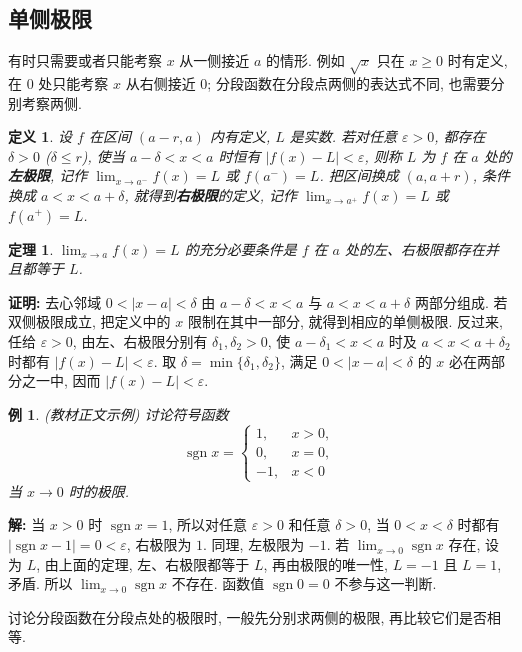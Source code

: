 \documentclass[UTF8,openany]{ctexbook}
\theoremstyle{chinesetextbook}
\newtheorem{definition}{定义}[section]
\newtheorem{example}{例}[section]
\newtheorem{theorem}{定理}[section]
\newenvironment{cnproof}{\par\indent\textbf{证明:} \ignorespaces}{\par}
\newenvironment{cnsolution}{\par\indent\textbf{解:} \ignorespaces}{\par}
\begin{document}
\subsection{单侧极限}
有时只需要或者只能考察 $x$ 从一侧接近 $a$ 的情形. 例如 $\sqrt x$ 只在 $x\ge0$ 时有定义, 在 $0$ 处只能考察 $x$ 从右侧接近 $0$; 分段函数在分段点两侧的表达式不同, 也需要分别考察两侧.
\begin{definition}
设 $f$ 在区间 $(a-r,a)$ 内有定义, $L$ 是实数. 若对任意 $\varepsilon>0$, 都存在 $\delta>0$ ($\delta\le r$), 使当 $a-\delta<x<a$ 时恒有 $|f(x)-L|<\varepsilon$, 则称 $L$ 为 $f$ 在 $a$ 处的\textbf{左极限}, 记作 $\displaystyle\lim_{x\to a^-}f(x)=L$ 或 $f(a^-)=L$. 把区间换成 $(a,a+r)$, 条件换成 $a<x<a+\delta$, 就得到\textbf{右极限}的定义, 记作 $\displaystyle\lim_{x\to a^+}f(x)=L$ 或 $f(a^+)=L$.
\end{definition}
\begin{theorem}
$\displaystyle\lim_{x\to a}f(x)=L$ 的充分必要条件是 $f$ 在 $a$ 处的左、右极限都存在并且都等于 $L$.
\end{theorem}
\begin{cnproof}
去心邻域 $0<|x-a|<\delta$ 由 $a-\delta<x<a$ 与 $a<x<a+\delta$ 两部分组成. 若双侧极限成立, 把定义中的 $x$ 限制在其中一部分, 就得到相应的单侧极限. 反过来, 任给 $\varepsilon>0$, 由左、右极限分别有 $\delta_1,\delta_2>0$, 使 $a-\delta_1<x<a$ 时及 $a<x<a+\delta_2$ 时都有 $|f(x)-L|<\varepsilon$. 取 $\delta=\min\{\delta_1,\delta_2\}$, 满足 $0<|x-a|<\delta$ 的 $x$ 必在两部分之一中, 因而 $|f(x)-L|<\varepsilon$.
\end{cnproof}
\begin{example}
\textnormal{(教材正文示例)} 讨论符号函数
\[
\operatorname{sgn}x=\begin{cases}1,&x>0,\\0,&x=0,\\-1,&x<0\end{cases}
\]
当 $x\to0$ 时的极限.
\end{example}
\begin{cnsolution}
当 $x>0$ 时 $\operatorname{sgn}x=1$, 所以对任意 $\varepsilon>0$ 和任意 $\delta>0$, 当 $0<x<\delta$ 时都有 $|\operatorname{sgn}x-1|=0<\varepsilon$, 右极限为 $1$. 同理, 左极限为 $-1$. 若 $\displaystyle\lim_{x\to0}\operatorname{sgn}x$ 存在, 设为 $L$, 由上面的定理, 左、右极限都等于 $L$, 再由极限的唯一性, $L=-1$ 且 $L=1$, 矛盾. 所以 $\displaystyle\lim_{x\to0}\operatorname{sgn}x$ 不存在. 函数值 $\operatorname{sgn}0=0$ 不参与这一判断.
\end{cnsolution}
讨论分段函数在分段点处的极限时, 一般先分别求两侧的极限, 再比较它们是否相等.
\end{document}
